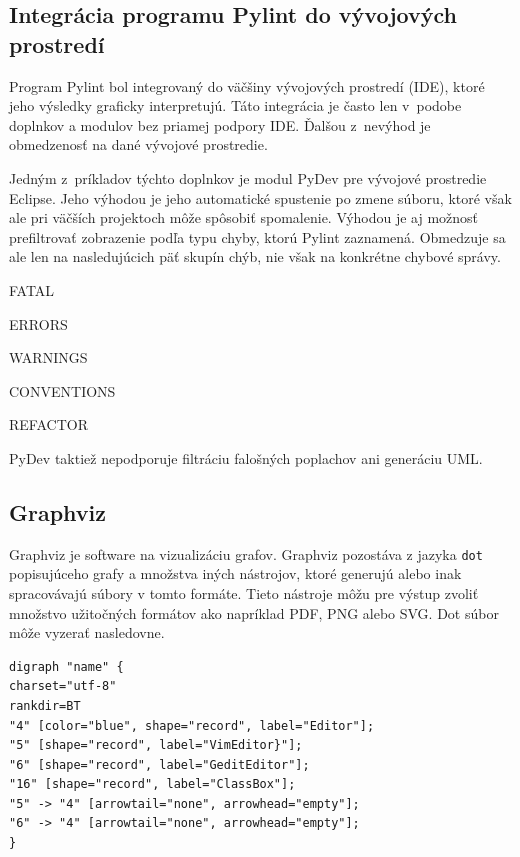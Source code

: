 \documentclass[11pt,oneside,final]{fithesis2}
\begin{document}
	\subsection{Integrácia programu Pylint do vývojových prostredí}
 
	Program Pylint bol integrovaný do väčšiny vývojových prostredí (IDE), ktoré jeho výsledky graficky interpretujú. Táto integrácia je často len v~podobe doplnkov a modulov bez priamej podpory IDE. Ďalšou z~nevýhod je obmedzenosť na dané vývojové prostredie. 
	
	Jedným z~príkladov týchto doplnkov je modul PyDev\cite{pydev} pre vývojové prostredie Eclipse. Jeho výhodou je jeho automatické spustenie po zmene súboru, ktoré však ale pri väčších projektoch môže spôsobiť spomalenie. Výhodou je aj možnosť prefiltrovať zobrazenie podľa typu chyby, ktorú Pylint zaznamená. Obmedzuje sa ale len na nasledujúcich päť skupín chýb, nie však na konkrétne chybové správy.

\begin{list}{•}{}
\item FATAL
\item ERRORS
\item WARNINGS
\item CONVENTIONS
\item REFACTOR
\end{list}
PyDev\cite{pydev} taktiež nepodporuje filtráciu falošných poplachov ani generáciu UML.
	
	\subsection{Graphviz}
	
	Graphviz je software na vizualizáciu grafov. Graphviz pozostáva z jazyka \texttt{dot} popisujúceho grafy a množstva iných nástrojov, ktoré generujú alebo inak spracovávajú súbory v tomto formáte. Tieto nástroje môžu pre výstup zvoliť množstvo užitočných formátov ako napríklad PDF, PNG alebo SVG. Dot súbor môže vyzerať nasledovne.
	
	
\begin{lstlisting}
digraph "name" {
charset="utf-8"
rankdir=BT
"4" [color="blue", shape="record", label="Editor"];
"5" [shape="record", label="VimEditor}"];
"6" [shape="record", label="GeditEditor"];
"16" [shape="record", label="ClassBox"];
"5" -> "4" [arrowtail="none", arrowhead="empty"];
"6" -> "4" [arrowtail="none", arrowhead="empty"];
}
\end{lstlisting}
\end{document}
